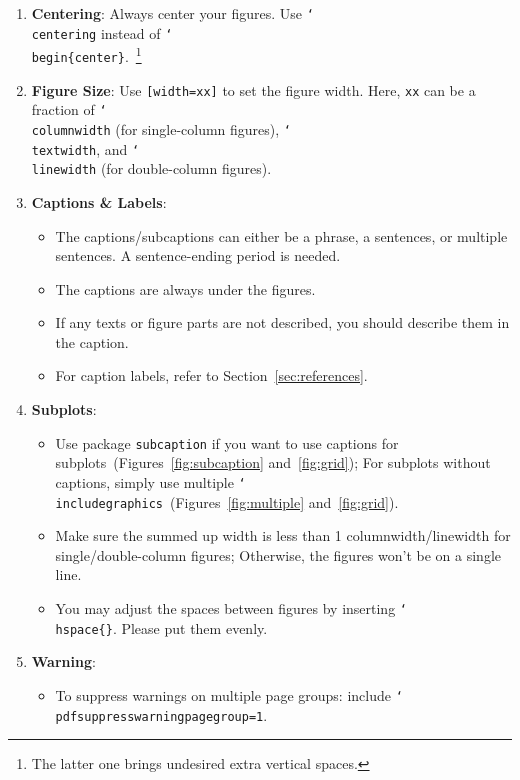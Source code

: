 \begin{enumerate}
  \item \textbf{Centering}:
    Always center your figures. Use \texttt{\char`\\centering} instead of \texttt{\char`\\begin\{center\}}.\
    \footnote{The latter one brings undesired extra vertical spaces.}

  \item \textbf{Figure Size}:
    Use \texttt{[width=xx]} to set the figure width.
    Here, \texttt{xx} can be a fraction of \texttt{\char`\\columnwidth} (for single-column figures), \texttt{\char`\\textwidth}, and \texttt{\char`\\linewidth} (for double-column figures).

  \item \textbf{Captions \& Labels}:
    \begin{itemize}
      \item The captions/subcaptions can either be a phrase, a sentences, or multiple sentences. A sentence-ending period is needed.
      \item The captions are always under the figures.
      \item If any texts or figure parts are not described, you should describe them in the caption.
      \item For caption labels, refer to Section~\ref{sec:references}.
    \end{itemize}

  \item \textbf{Subplots}:
    \begin{itemize}
      \item Use package \texttt{subcaption} if you want to use captions for subplots~(Figures~\ref{fig:subcaption} and~\ref{fig:grid}); For subplots without captions, simply use multiple \texttt{\char`\\includegraphics}~(Figures~\ref{fig:multiple} and~\ref{fig:grid}).
      \item Make sure the summed up width is less than 1 columnwidth/linewidth for single/double-column figures; Otherwise, the figures won't be on a single line.
      \item You may adjust the spaces between figures by inserting \texttt{\char`\\hspace\{\}}. Please put them evenly.
    \end{itemize}

  \item \textbf{Warning}:
    \begin{itemize}
      \item To suppress warnings on multiple page groups: include \texttt{\char`\\pdfsuppresswarningpagegroup=1}.
    \end{itemize}
\end{enumerate}
